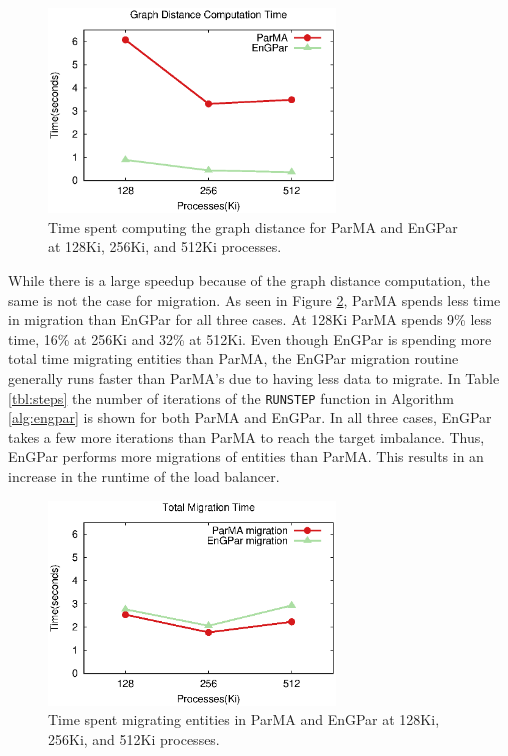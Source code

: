 \begin{figure}[!ht]
  \centering
  \includegraphics[width=3in]{results/gd_v_cores.eps}
  \caption{Time spent computing the graph distance for ParMA and EnGPar  at 128Ki, 256Ki, and 512Ki processes.}
  \label{fig:gdtime}
\end{figure}

While there is a large speedup because of the graph
distance computation, the same is not the case for migration.
As seen in Figure \ref{fig:migration}, ParMA spends
less time in migration than EnGPar for all three cases.
At 128Ki ParMA
spends 9\% less time, 16\% at 256Ki and 32\% at 512Ki.
Even though EnGPar is spending more total time 
migrating entities than ParMA, the EnGPar migration
routine generally runs faster than ParMA's due to
having less data to migrate. In
Table \ref{tbl:steps} the number of iterations of the
\texttt{RUNSTEP} function in Algorithm \ref{alg:engpar} is
shown for both ParMA and EnGPar. In all three cases,
EnGPar takes a few more iterations than ParMA to reach
the target imbalance. Thus, EnGPar performs more migrations
of entities than ParMA. This results in an increase in the
runtime of the load balancer.

\begin{figure}[!ht]
  \centering
  \includegraphics[width=3in]{results/migrate_v_cores.eps}
  \caption{Time spent migrating entities in ParMA and EnGPar at 128Ki, 256Ki, and 512Ki processes.}
  \label{fig:migration}
\end{figure}

